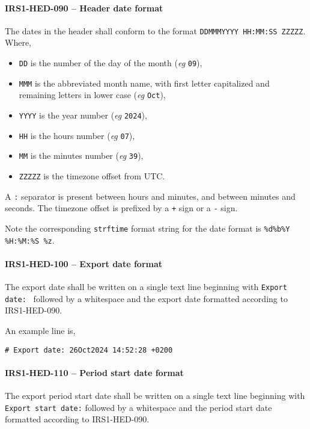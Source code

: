 \paragraph{IRS1-HED-090 -- Header date format}
The dates in the header shall conform to the format
\lstinline{DDMMMYYYY HH:MM:SS ZZZZZ}.
Where,
\begin{itemize}
\item \lstinline{DD} is the number of the day of the month
  (\textit{eg} \lstinline{09}),
\item \lstinline{MMM} is the abbreviated month name, with first letter
  capitalized and remaining letters in lower case (\textit{eg} \lstinline{Oct}),
\item \lstinline{YYYY} is the year number (\textit{eg} \lstinline{2024}),
\item \lstinline{HH} is the hours number (\textit{eg} \lstinline{07}),
\item \lstinline{MM} is the minutes number (\textit{eg} \lstinline{39}),
\item \lstinline{ZZZZZ} is the timezone offset from \gls{UTC}.
\end{itemize}

A \lstinline{:} separator is present between hours and minutes, and between
minutes and seconds. The timezone offset is prefixed by a \lstinline{+} sign
or a \lstinline{-} sign.

Note the corresponding \lstinline{strftime} \cite{cpp:strftime} format string
for the date format is \lstinline{%d%b%Y %H:%M:%S %z}.

\paragraph{IRS1-HED-100 -- Export date format}
The export date shall be written on a single text line beginning with
\lstinline{Export date: } followed by a whitespace and the export date
formatted according to IRS1-HED-090.

An example line is,
\begin{lstlisting}[numbers=none]
  # Export date: 26Oct2024 14:52:28 +0200
\end{lstlisting}

\paragraph{IRS1-HED-110 -- Period start date format}
The export period start date shall be written on a single text line beginning
with \lstinline{Export start date:} followed by a whitespace and the period
start date formatted according to IRS1-HED-090.

